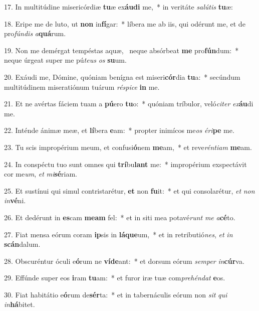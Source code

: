 17. In multitúdine misericórdiæ \textbf{tu}æ ex\textbf{áu}\textbf{di} me,~*  in veritáte \textit{sa}\textit{lú}\textit{tis} \textbf{tu}æ:\

18. Eripe me de luto, ut \textbf{non} in\textbf{fí}gar:~*  líbera me ab iis, qui odérunt me, et de pro\textit{fún}\textit{dis} \textit{a}\textbf{quá}rum.\

19. Non me demérgat tempéstas aquæ, \dag\  neque absórbeat \textbf{me} pro\textbf{fún}dum:~*  neque úrgeat super me pú\textit{te}\textit{us} \textit{os} \textbf{su}um.\

20. Exáudi me, Dómine, quóniam benígna est miseri\textbf{cór}dia \textbf{tu}a:~*  secúndum multitúdinem miseratiónum tuárum \textit{ré}\textit{spi}\textit{ce} \textbf{in} me.\

21. Et ne avértas fáciem tuam a \textbf{pú}ero \textbf{tu}o:~*  quóniam tríbulor, veló\textit{ci}\textit{ter} \textit{ex}\textbf{áu}di me.\

22. Inténde ánimæ meæ, et \textbf{lí}bera \textbf{e}am:~*  propter inimícos me\textit{os} \textit{é}\textit{ri}\textbf{pe} me.\

23. Tu scis impropérium meum, et confusi\textbf{ó}nem \textbf{me}am,~*  et reve\textit{rén}\textit{ti}\textit{am} \textbf{me}am.\

24. In conspéctu tuo sunt omnes qui \textbf{trí}bu\textbf{lant} me:~*  impropérium exspectávit cor me\textit{um}, \textit{et} \textit{mi}\textbf{sé}riam.\

25. Et sustínui qui simul contristarétur, \textbf{et} non \textbf{fu}it:~*  et qui consolarétur, \textit{et} \textit{non} \textit{in}\textbf{vé}ni.\

26. Et dedérunt in \textbf{es}cam \textbf{me}\textbf{am} fel:~*  et in siti mea potavé\textit{runt} \textit{me} \textit{a}\textbf{cé}to.\

27. Fiat mensa eórum coram \textbf{ip}sis in \textbf{lá}\textbf{que}um,~*  et in retributió\textit{nes}, \textit{et} \textit{in} \textbf{scán}dalum.\

28. Obscuréntur óculi e\textbf{ó}rum ne \textbf{ví}\textbf{de}ant:~*  et dorsum eórum \textit{sem}\textit{per} \textit{in}\textbf{cúr}va.\

29. Effúnde super eos \textbf{i}ram \textbf{tu}am:~*  et furor iræ tuæ com\textit{pre}\textit{hén}\textit{dat} \textbf{e}os.\

30. Fiat habitátio e\textbf{ó}rum de\textbf{sér}ta:~*  et in tabernáculis eórum non \textit{sit} \textit{qui} \textit{in}\textbf{há}bitet.\

